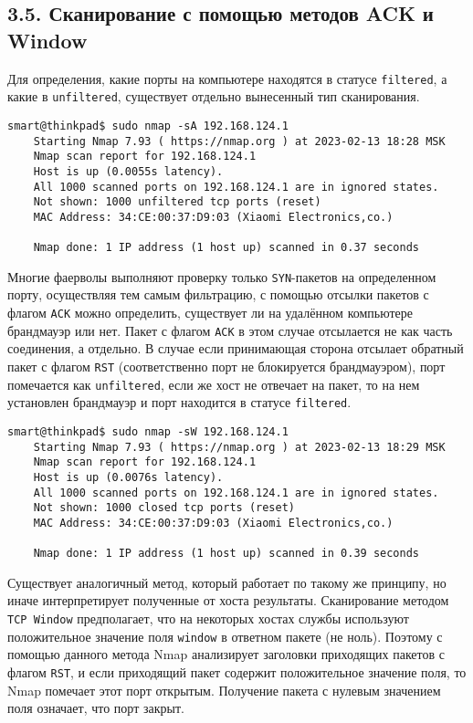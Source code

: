 \subsection*{3.5. Сканирование с помощью методов ACK и Window}

Для определения, какие порты на компьютере находятся в статусе \texttt{filtered}, а какие в \texttt{unfiltered}, существует отдельно вынесенный тип сканирования.

\begin{Verbatim}[frame=single]
    smart@thinkpad$ sudo nmap -sA 192.168.124.1
    Starting Nmap 7.93 ( https://nmap.org ) at 2023-02-13 18:28 MSK
    Nmap scan report for 192.168.124.1
    Host is up (0.0055s latency).
    All 1000 scanned ports on 192.168.124.1 are in ignored states.
    Not shown: 1000 unfiltered tcp ports (reset)
    MAC Address: 34:CE:00:37:D9:03 (Xiaomi Electronics,co.)
    
    Nmap done: 1 IP address (1 host up) scanned in 0.37 seconds
\end{Verbatim}

Многие фаерволы выполняют проверку только \texttt{SYN}-пакетов на определенном порту, осуществляя тем самым фильтрацию, с помощью отсылки пакетов с флагом \texttt{ACK} можно определить, существует ли на удалённом компьютере брандмауэр или нет. Пакет с флагом \texttt{ACK} в этом случае отсылается не как часть соединения, а отдельно. В случае если принимающая сторона отсылает обратный пакет с флагом \texttt{RST} (соответственно порт не блокируется брандмауэром), порт помечается как \texttt{unfiltered}, если же хост не отвечает на пакет, то на нем установлен брандмауэр и порт находится в статусе \texttt{filtered}.

\begin{Verbatim}[frame=single]
    smart@thinkpad$ sudo nmap -sW 192.168.124.1
    Starting Nmap 7.93 ( https://nmap.org ) at 2023-02-13 18:29 MSK
    Nmap scan report for 192.168.124.1
    Host is up (0.0076s latency).
    All 1000 scanned ports on 192.168.124.1 are in ignored states.
    Not shown: 1000 closed tcp ports (reset)
    MAC Address: 34:CE:00:37:D9:03 (Xiaomi Electronics,co.)

    Nmap done: 1 IP address (1 host up) scanned in 0.39 seconds
\end{Verbatim}

Существует аналогичный метод, который работает по такому же принципу, но иначе интерпретирует полученные от хоста результаты. Сканирование методом \texttt{TCP Window} предполагает, что на некоторых хостах службы используют положительное значение поля \texttt{window} в ответном пакете (не ноль). Поэтому с помощью данного метода Nmap анализирует заголовки приходящих пакетов с флагом \texttt{RST}, и если приходящий пакет содержит положительное значение поля, то Nmap помечает этот порт открытым. Получение пакета с нулевым значением поля означает, что порт закрыт.

